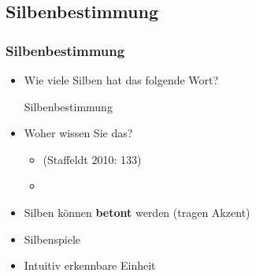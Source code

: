 \subsection{Silbenbestimmung}

\begin{frame}
\frametitle{Silbenbestimmung}

\begin{itemize}
	\item<1-> Wie viele Silben hat das folgende Wort?
	
	\ea Silbenbestimmung
	\z
	
	\item<2-> Woher wissen Sie das?
	
	\begin{itemize}
		\item<2->   (Staffeldt 2010: 133)
		
		\item<2->  \citep[600]{Bussmann02a}
		
	\end{itemize}

	\item<2-> Silben können \textbf{betont} werden (tragen Akzent)
	
	\item<2-> Silbenspiele
	
	\item<2-> Intuitiv erkennbare Einheit

\end{itemize}

\end{frame}



